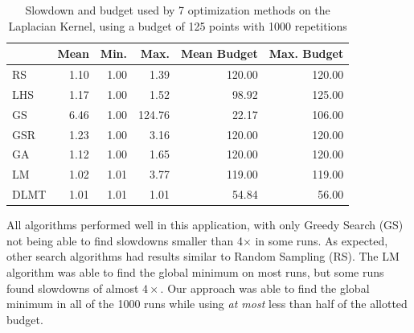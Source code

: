 \documentclass[conference]{IEEEtran}
\begin{document}
\begin{table}[ht]
\centering
\caption{Slowdown and budget used by 7 optimization methods on the Laplacian Kernel, using a budget of 125 points with 1000 repetitions}
\label{tab:gpu_laplacian_compare_budget}
\begingroup\footnotesize
\begin{tabular}{lrrrrr}
  \toprule
 & Mean & Min. & Max. & Mean Budget & Max. Budget \\
  \midrule
RS & 1.10 & 1.00 & 1.39 & 120.00 & 120.00 \\
  LHS & 1.17 & 1.00 & 1.52 & 98.92 & 125.00 \\
  GS & 6.46 & 1.00 & 124.76 & 22.17 & 106.00 \\
  GSR & 1.23 & 1.00 & 3.16 & 120.00 & 120.00 \\
  GA & 1.12 & 1.00 & 1.65 & 120.00 & 120.00 \\
  LM & 1.02 & 1.01 & 3.77 & 119.00 & 119.00 \\
  DLMT & 1.01 & 1.01 & 1.01 & 54.84 & 56.00 \\
   \bottomrule
\end{tabular}
\endgroup
\end{table}

All algorithms performed well in this application, with only Greedy Search (GS)
not being able to find slowdowns smaller than 4\(\times\) in some runs. As
expected, other search algorithms had results similar to Random Sampling (RS).
The LM algorithm was able to find the global minimum on most runs, but some runs
found slowdowns of almost \(4\times\). Our approach was able to find the global
minimum in all of the 1000 runs while using \emph{at most} less than half of the
allotted budget.
\end{document}
